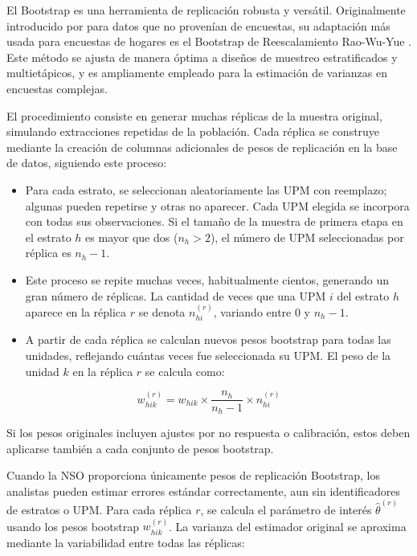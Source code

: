 \documentclass[
  spanish,
  12pt,
]{book}
\providecommand{\tightlist}{%
  \setlength{\itemsep}{0pt}\setlength{\parskip}{0pt}}
\begin{document}
El Bootstrap es una herramienta de replicación robusta y versátil. Originalmente introducido por \citet{efron1979bootstrap} para datos que no provenían de encuestas, su adaptación más usada para encuestas de hogares es el Bootstrap de Reescalamiento Rao-Wu-Yue \citep{rao1992resampling}. Este método se ajusta de manera óptima a diseños de muestreo estratificados y multietápicos, y es ampliamente empleado para la estimación de varianzas en encuestas complejas.

El procedimiento consiste en generar muchas réplicas de la muestra original, simulando extracciones repetidas de la población. Cada réplica se construye mediante la creación de columnas adicionales de pesos de replicación en la base de datos, siguiendo este proceso:

\begin{itemize}
\tightlist
\item
  Para cada estrato, se seleccionan aleatoriamente las UPM con reemplazo; algunas pueden repetirse y otras no aparecer. Cada UPM elegida se incorpora con todas sus observaciones. Si el tamaño de la muestra de primera etapa en el estrato \(h\) es mayor que dos (\(n_h > 2\)), el número de UPM seleccionadas por réplica es \(n_h - 1\).
\item
  Este proceso se repite muchas veces, habitualmente cientos, generando un gran número de réplicas. La cantidad de veces que una UPM \(i\) del estrato \(h\) aparece en la réplica \(r\) se denota \(n_{hi}^{(r)}\), variando entre 0 y \(n_h - 1\).
\item
  A partir de cada réplica se calculan nuevos pesos bootstrap para todas las unidades, reflejando cuántas veces fue seleccionada su UPM. El peso de la unidad \(k\) en la réplica \(r\) se calcula como:
\end{itemize}

\[
w_{hik}^{(r)} = w_{hik} \times \frac{n_h}{n_h - 1} \times n_{hi}^{(r)}
\]

Si los pesos originales incluyen ajustes por no respuesta o calibración, estos deben aplicarse también a cada conjunto de pesos bootstrap.

Cuando la NSO proporciona únicamente pesos de replicación Bootstrap, los analistas pueden estimar errores estándar correctamente, aun sin identificadores de estratos o UPM. Para cada réplica \(r\), se calcula el parámetro de interés \(\hat{\theta}^{(r)}\) usando los pesos bootstrap \(w_{hik}^{(r)}\). La varianza del estimador original se aproxima mediante la variabilidad entre todas las réplicas:
\end{document}
